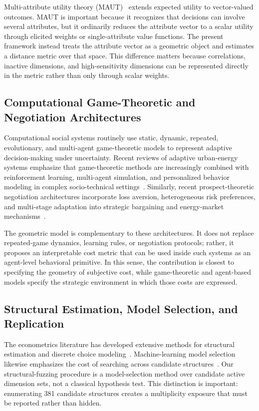 \documentclass[journal]{IEEEtran}
\begin{document}
Multi-attribute utility theory (MAUT)~\cite{keeney1993} extends expected utility to vector-valued outcomes.
MAUT is important because it recognizes that decisions can involve several attributes, but it ordinarily reduces the attribute vector to a scalar utility through elicited weights or single-attribute value functions.
The present framework instead treats the attribute vector as a geometric object and estimates a distance metric over that space.
This difference matters because correlations, inactive dimensions, and high-sensitivity dimensions can be represented directly in the metric rather than only through scalar weights.

\subsection{Computational Game-Theoretic and Negotiation Architectures}

Computational social systems routinely use static, dynamic, repeated, evolutionary, and multi-agent game-theoretic models to represent adaptive decision-making under uncertainty.
Recent reviews of adaptive urban-energy systems emphasize that game-theoretic methods are increasingly combined with reinforcement learning, multi-agent simulation, and personalized behavior modeling in complex socio-technical settings~\cite{cheng2026urban}.
Similarly, recent prospect-theoretic negotiation architectures incorporate loss aversion, heterogeneous risk preferences, and multi-stage adaptation into strategic bargaining and energy-market mechanisms~\cite{cheng2025vpp}.

The geometric model is complementary to these architectures.
It does not replace repeated-game dynamics, learning rules, or negotiation protocols; rather, it proposes an interpretable cost metric that can be used inside such systems as an agent-level behavioral primitive.
In this sense, the contribution is closest to specifying the geometry of subjective cost, while game-theoretic and agent-based models specify the strategic environment in which those costs are expressed.

\subsection{Structural Estimation, Model Selection, and Replication}

The econometrics literature has developed extensive methods for structural estimation and discrete choice modeling~\cite{train2009}.
Machine-learning model selection likewise emphasizes the cost of searching across candidate structures~\cite{hastie2009}.
Our structural-fuzzing procedure is a model-selection method over candidate active dimension sets, not a classical hypothesis test.
This distinction is important: enumerating 381 candidate structures creates a multiplicity exposure that must be reported rather than hidden.
\end{document}

